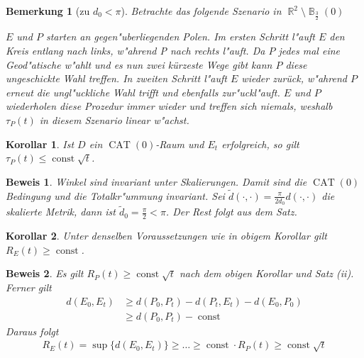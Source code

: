 \documentclass[paper=A4, twoside, chapterprefix=true, bibliography=totoc, headsepline]{scrbook}
\newcommand{\tikzgitter}[3][0.25]{ %
	\draw[step=#1,gray!15] #2 grid #3;
	\draw[step=2*#1,gray!30] #2 grid #3;
	\fill (0,0) circle(0.1); 
}
\DeclareMathOperator{\B}{\mathbb{B}} %
\DeclareMathOperator{\R}{\mathbb{R}}
\DeclareMathOperator{\const}{const} %
\DeclareMathOperator{\CAT}{CAT}
\theoremstyle{break}
\theoremstyle{nonumberbreak}
\newtheorem{kor}{Korollar}
\newtheorem{bem}{Bemerkung}
\newtheorem{bew}{Beweis}
\theoremstyle{emptybreak}
\theoremstyle{break}
\begin{document}
\begin{bem}[zu $d_0 < \pi$]
Betrachte das folgende Szenario in $\R^2 \setminus \B_{\frac{3}{2}}(0)$
\begin{center}\end{center}
$E$ und $P$ starten an gegen"uberliegenden Polen.
Im ersten Schritt l"auft $E$ den Kreis entlang nach links, w"ahrend P nach rechts l"auft.
Da $P$ jedes mal eine Geod"atische w"ahlt und es nun zwei kürzeste Wege gibt kann $P$ diese ungeschickte Wahl treffen.
In zweiten Schritt l"auft $E$ wieder zurück, w"ahrend $P$ erneut die ungl"uckliche Wahl trifft und ebenfalls zur"uckl"auft.
$E$ und $P$ wiederholen diese Prozedur immer wieder und treffen sich niemals, weshalb $\tau_P(t)$ in diesem Szenario linear w"achst.
\end{bem}

\begin{kor}
Ist $D$ ein $\CAT(0)$-Raum und $E_t$ erfolgreich, so gilt $\tau_P(t) \le \const \sqrt{t}$.
\end{kor}

\begin{bew}
Winkel sind invariant unter Skalierungen.
Damit  sind die $\CAT(0)$ Bedingung und die Totalkr"ummung invariant.
Sei $\tilde{d}(\cdot, \cdot) = \frac{\pi}{2 d_0} d(\cdot, \cdot)$ die skalierte Metrik, dann ist $\tilde{d}_0 = \frac{\pi}{2} < \pi$.
Der Rest folgt aus dem Satz.
\end{bew}

\begin{kor}
Unter denselben Voraussetzungen wie in obigem Korollar gilt $R_E(t) \ge \const$.
\end{kor}

\begin{bew}
Es gilt $R_P(t) \ge \const \sqrt{t}$ nach dem obigen Korollar und Satz (ii).
Ferner gilt
\begin{align*}
	d(E_0, E_t) &\ge d(P_0, P_t) - d(P_t, E_t) - d(E_0,P_0) \\
	&\ge d(P_0, P_t) - \const
\end{align*}
Daraus folgt
\begin{align*}
	R_E(t) = \sup \{ d(E_0, E_t) \} \ge \ldots \ge \const \cdot R_P(t) \ge \const \sqrt t
\end{align*}
\end{bew}
\end{document}
